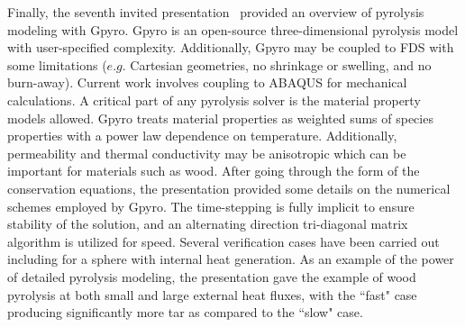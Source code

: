 Finally, the seventh invited presentation~\cite{CPS:Lautenberger} provided an overview of pyrolysis modeling with Gpyro.  Gpyro is an open-source three-dimensional pyrolysis model with user-specified complexity.  Additionally, Gpyro may be coupled to FDS with some limitations ($e.g.$ Cartesian geometries, no shrinkage or swelling, and no burn-away).  Current work involves coupling to ABAQUS for mechanical calculations.  A critical part of any pyrolysis solver is the material property models allowed.  Gpyro treats material properties as weighted sums of species properties with a power law dependence on temperature.  Additionally, permeability and thermal conductivity may be anisotropic which can be important for materials such as wood.  After going through the form of the conservation equations, the presentation provided some details on the numerical schemes employed by Gpyro.  The time-stepping is fully implicit to ensure stability of the solution, and an alternating direction tri-diagonal matrix algorithm is utilized for speed.  Several verification cases have been carried out including for a sphere with internal heat generation.  As an example of the power of detailed pyrolysis modeling, the presentation gave the example of wood pyrolysis at both small and large external heat fluxes, with the ``fast" case producing significantly more tar as compared to the ``slow" case.

